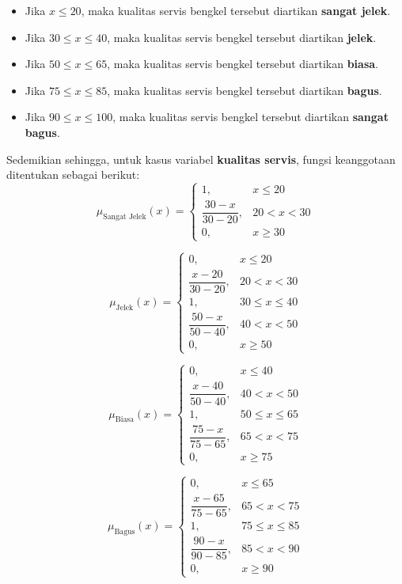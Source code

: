\documentclass[12pt,a4paper]{article}
\theoremstyle{remark}
\begin{document}
\begin{itemize}
    \item Jika $x \leq 20$, maka kualitas servis bengkel tersebut diartikan \textbf{sangat jelek}.
    \item Jika $30 \leq x \leq 40$, maka kualitas servis bengkel tersebut diartikan \textbf{jelek}.
    \item Jika $50 \leq x \leq 65$, maka kualitas servis bengkel tersebut diartikan \textbf{biasa}.
    \item Jika $75 \leq x \leq 85$, maka kualitas servis bengkel tersebut diartikan \textbf{bagus}.
    \item Jika $90 \leq x \leq 100$, maka kualitas servis bengkel tersebut diartikan \textbf{sangat bagus}.
\end{itemize}

Sedemikian sehingga, untuk kasus variabel \textbf{kualitas servis}, fungsi keanggotaan ditentukan sebagai berikut:
\[
\mu_{\text{Sangat Jelek}}(x) =
\begin{cases}
1, & x \leq 20 \\
\dfrac{30 - x}{30 - 20}, & 20 < x < 30 \\
0, & x \geq 30
\end{cases}
\]

\[
\mu_{\text{Jelek}}(x) =
\begin{cases}
0, & x \leq 20 \\
\dfrac{x - 20}{30 - 20}, & 20 < x < 30 \\
1, & 30 \leq x \leq 40 \\
\dfrac{50 - x}{50 - 40}, & 40 < x < 50 \\
0, & x \geq 50
\end{cases}
\]

\[
\mu_{\text{Biasa}}(x) =
\begin{cases}
0, & x \leq 40 \\
\dfrac{x - 40}{50 - 40}, & 40 < x < 50 \\
1, & 50 \leq x \leq 65 \\
\dfrac{75 - x}{75 - 65}, & 65 < x < 75 \\
0, & x \geq 75
\end{cases}
\]

\[
\mu_{\text{Bagus}}(x) =
\begin{cases}
0, & x \leq 65 \\
\dfrac{x - 65}{75 - 65}, & 65 < x < 75 \\
1, & 75 \leq x \leq 85 \\
\dfrac{90 - x}{90 - 85}, & 85 < x < 90 \\
0, & x \geq 90
\end{cases}
\]
\end{document}
